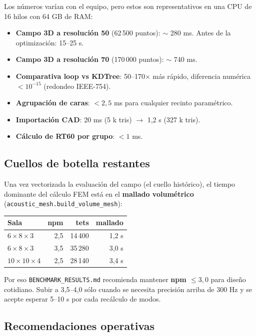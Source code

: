\documentclass[11pt, a4paper]{article}
\begin{document}
Los números varían con el equipo, pero estos son representativos en
una CPU de 16 hilos con 64 GB de RAM:

\begin{itemize}
  \item \textbf{Campo 3D a resolución 50} (62\,500 puntos): $\sim$ 280 ms.
        Antes de la optimización: 15--25 s.
  \item \textbf{Campo 3D a resolución 70} (170\,000 puntos): $\sim$ 740 ms.
  \item \textbf{Comparativa loop vs KDTree}: 50--170$\times$ más rápido,
        diferencia numérica $< 10^{-15}$ (redondeo IEEE-754).
  \item \textbf{Agrupación de caras}: $< 2{,}5$ ms para cualquier
        recinto paramétrico.
  \item \textbf{Importación CAD}: 20 ms (5 k tris) $\to$ 1{,}2 s (327 k tris).
  \item \textbf{Cálculo de RT60 por grupo}: $< 1$ ms.
\end{itemize}

\subsection{Cuellos de botella restantes}

Una vez vectorizada la evaluación del campo (el cuello histórico),
el tiempo dominante del cálculo FEM está en el \textbf{mallado
volumétrico} (\texttt{acoustic\_mesh.build\_volume\_mesh}):

\begin{tabular}{lrrr}
  \toprule
  Sala & npm & tets & mallado \\
  \midrule
  $6\times 8\times 3$  & 2{,}5 & 14\,400 & 1{,}2 s \\
  $6\times 8\times 3$  & 3{,}5 & 35\,280 & 3{,}0 s \\
  $10\times 10\times 4$ & 2{,}5 & 28\,140 & 3{,}4 s \\
  \bottomrule
\end{tabular}

Por eso \texttt{BENCHMARK\_RESULTS.md} recomienda mantener
\textbf{npm $\leq 3{,}0$} para diseño cotidiano. Subir a 3{,}5--4{,}0
sólo cuando se necesita precisión arriba de 300 Hz y se acepte
esperar 5--10 s por cada recálculo de modos.

\subsection{Recomendaciones operativas}
\end{document}
